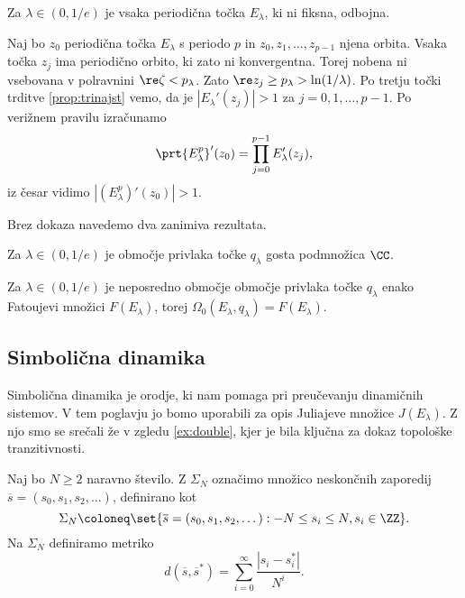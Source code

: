 \begin{posledica}
    Za \(\lambda \in (0, 1/e)\) je vsaka periodična točka \(E_\lambda\), ki ni fiksna, odbojna.
\end{posledica}

\begin{dokaz}
    Naj bo \(z_0\) periodična točka \(E_\lambda\) s periodo \(p\) in \(z_0, z_1, \dots, z_{p - 1}\) njena orbita. Vsaka točka \(z_j\) ima periodično orbito, ki zato ni konvergentna. Torej nobena ni vsebovana v polravnini \(\re \zeta < p_\lambda\). Zato \(\re z_j \geq p_\lambda > \ln (1 / \lambda)\). Po tretju točki trditve \ref{prop:trinajst} vemo, da je \(|E_\lambda' (z_j)| > 1\) za \(j = 0, 1, \dots, p - 1\). Po verižnem pravilu izračunamo
    \[\prt{E_\lambda^p}' (z_0) = \prod_{j = 0}^{p - 1} E_\lambda' (z_j),\]
    iz česar vidimo \(|(E_\lambda^p)' (z_0)| > 1\).
\end{dokaz}

Brez dokaza navedemo dva zanimiva rezultata.

\begin{trditev}
    Za \(\lambda \in (0, 1/e)\) je območje privlaka točke \(q_\lambda\) gosta podmnožica \(\CC\).
\end{trditev}

\begin{izrek}
    Za \(\lambda \in (0, 1/e)\) je neposredno območje območje privlaka točke \(q_\lambda\) enako Fatoujevi množici \(F (E_\lambda)\), torej \(\Omega_0 (E_\lambda, q_\lambda) = F (E_\lambda)\).
\end{izrek}

\subsection{Simbolična dinamika}

Simbolična dinamika je orodje, ki nam pomaga pri preučevanju dinamičnih sistemov. V tem poglavju jo bomo uporabili za opis Juliajeve množice \(J (E_\lambda)\). Z njo smo se srečali že v zgledu \ref{ex:double}, kjer je bila ključna za dokaz topološke tranzitivnosti.

Naj bo \(N \geq 2\) naravno število. Z \(\Sigma_N\) označimo množico neskončnih zaporedij \(\overline{s} = (s_0, s_1, s_2, \dots)\), definirano kot
\[\Sigma_N \coloneq \set{\overline{s} = (s_0, s_1, s_2, \dots) : - N \leq s_i \leq N, s_i \in \ZZ}.\]
Na \(\Sigma_N\) definiramo metriko
\[d (\overline{s}, \overline{s}^*) = \sum_{i = 0}^{\infty} \frac{|s_i - s_i^*|}{N^i}.\]

